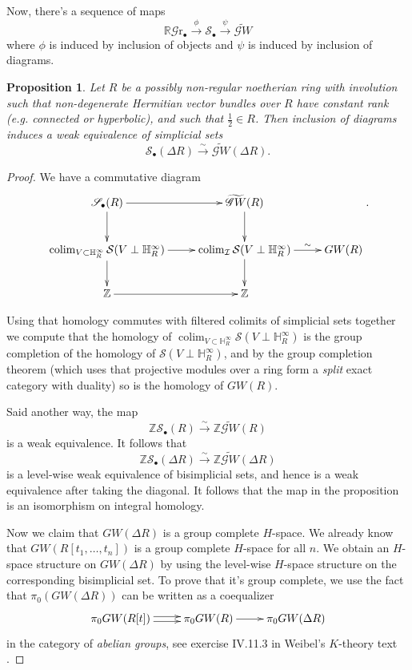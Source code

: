 \documentclass[edeposit,fullpage]{uiucthesis2009}
\newcommand{\Z}{\mathbb Z}
\newcommand{\mbb}{\mathbb}
\newcommand{\mc}{\mathcal}
\newcommand{\hRGr}{\mathbb R\mathscr{G}{\mathrm{r}}}
\DeclareMathOperator*{\colim}{colim}
\theoremstyle{plain}
\numberwithin{lemma}{section}
\newtheorem{proposition}[lemma]{Proposition}
\theoremstyle{definition}
\begin{document}
Now, there's a sequence of maps
\[
\hRGr_\bullet \xrightarrow{\phi} \mathscr S_\bullet \xrightarrow{\psi}
\widetilde{\mathscr GW}
\]
where $\phi$ is induced by inclusion of objects and $\psi$ is induced
by inclusion of diagrams. 

\begin{proposition}\label{prop:Bet_GW}
Let $R$ be a possibly non-regular noetherian ring with involution
such that
non-degenerate Hermitian vector bundles over $R$ have constant rank (e.g. connected or hyperbolic),
and such that $\frac{1}{2} \in R$. Then inclusion of diagrams induces
a weak equivalence of simplicial sets
\[
\mathscr S_\bullet(\Delta R) \xrightarrow{\sim} \widetilde{\mathscr{G}W}(\Delta R).
\]
\end{proposition}



\begin{proof}
We have a commutative diagram
\[
\xymatrix{\mathscr S_\bullet(R) \ar[r]\ar[d] &
  \widetilde{\mathscr{G}W}( R) \ar[d] \\
\colim_{V \subset \mbb H_R^\infty} \mc S(V \perp\mbb H_R^\infty) \ar[r]
\ar[d] & \colim_{\mc I}\mc S(V \perp\mbb H_R^\infty)  \ar[d] \ar[r]^-\sim
& GW(R)\\
\Z \ar[r] & \Z}.
\]

Using that homology commutes with filtered colimits of simplicial
sets together we compute that the homology of $\colim_{V \subset \mbb
  H_R^\infty} \mc S(V \perp\mbb H_R^\infty)$ is the group completion
of the homology of $\mc S(V \perp\mbb H_R^\infty)$, and by the group
completion theorem (which uses that projective modules over a ring
form a \emph{split} exact category with duality) so is the homology of $GW(R)$.

 Said another way, the
map
\[
\Z\mathscr S_\bullet( R) \xrightarrow{\sim} \Z\widetilde{\mathscr{G}W}( R)
\]
is a weak equivalence. It follows that
\[
\Z\mathscr S_\bullet(\Delta R) \xrightarrow{\sim} \Z\widetilde{\mathscr{G}W}(\Delta R)
\]
is a level-wise weak equivalence of bisimplicial sets, and hence is a
weak equivalence after taking the diagonal. It follows that the map in
the proposition is an isomorphism on integral homology. 

Now we claim that $GW(\Delta R)$ is a group complete $H$-space. We
already know that
$GW(R[t_1,\dots,t_n])$ is a group complete $H$-space for all $n$. We
obtain an $H$-space structure on $GW(\Delta R)$ by using the
level-wise $H$-space structure on the corresponding bisimplicial
set. To prove that it's group complete, we use the fact that
$\pi_0(GW(\Delta R))$ can be written as a coequalizer
\[
\xymatrix{\pi_0GW(R[t]) \ar@<0.5ex>[r] \ar@<-0.5ex>[r] & \pi_0GW(R)
  \ar[r] & \pi_0GW(\Delta R)}
\]
in the category of \emph{abelian groups}, see exercise IV.11.3 in
Weibel's $K$-theory text \cite{Kbook}.


\end{proof}
\end{document}
